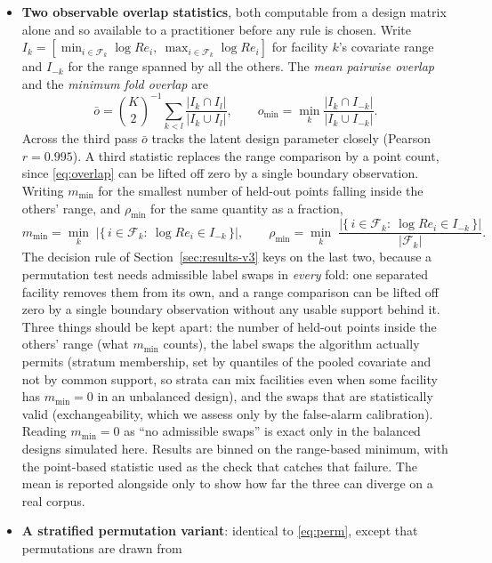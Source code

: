 \documentclass[journal=dce]{CUP-JNL-DTM}%
\begin{document}
\begin{itemize}
  \item \textbf{Two observable overlap statistics}, both computable from a design matrix alone and so available to a practitioner before any rule is chosen. Write $I_k=[\min_{i\in\mathcal{F}_k}\log Re_i,\ \max_{i\in\mathcal{F}_k}\log Re_i]$ for facility $k$'s covariate range and $I_{-k}$ for the range spanned by all the others. The \emph{mean pairwise overlap} and the \emph{minimum fold overlap} are
\begin{equation}
\bar{o}=\binom{K}{2}^{-1}\!\!\sum_{k<l}\frac{|I_k\cap I_l|}{|I_k\cup I_l|},
\qquad
o_{\min}=\min_{k}\frac{|I_k\cap I_{-k}|}{|I_k\cup I_{-k}|}.
\label{eq:overlap}
\end{equation}
Across the third pass $\bar{o}$ tracks the latent design parameter closely (Pearson $r=0.995$). A third statistic replaces the range comparison by a point count, since \eqref{eq:overlap} can be lifted off zero by a single boundary observation. Writing $m_{\min}$ for the smallest number of held-out points falling inside the others' range, and $\rho_{\min}$ for the same quantity as a fraction,
\begin{equation}
m_{\min}=\min_{k}\;\bigl|\{\,i\in\mathcal{F}_k:\ \log Re_i\in I_{-k}\,\}\bigr|,
\qquad
\rho_{\min}=\min_{k}\;\frac{\bigl|\{\,i\in\mathcal{F}_k:\ \log Re_i\in I_{-k}\,\}\bigr|}{|\mathcal{F}_k|}.
\label{eq:points}
\end{equation} The decision rule of Section~\ref{sec:results-v3} keys on the last two, because a permutation test needs admissible label swaps in \emph{every} fold: one separated facility removes them from its own, and a range comparison can be lifted off zero by a single boundary observation without any usable support behind it. Three things should be kept apart: the number of held-out points inside the others' range (what $m_{\min}$ counts), the label swaps the algorithm actually permits (stratum membership, set by quantiles of the pooled covariate and not by common support, so strata can mix facilities even when some facility has $m_{\min}=0$ in an unbalanced design), and the swaps that are statistically valid (exchangeability, which we assess only by the false-alarm calibration). Reading $m_{\min}=0$ as ``no admissible swaps'' is exact only in the balanced designs simulated here. Results are binned on the range-based minimum, with the point-based statistic used as the check that catches that failure. The mean is reported alongside only to show how far the three can diverge on a real corpus.
  \item \textbf{A stratified permutation variant}: identical to \eqref{eq:perm}, except that permutations are drawn from

\end{itemize}
\end{document}
